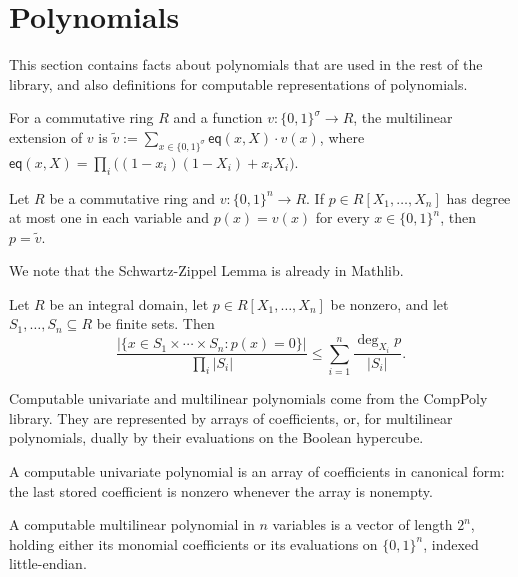 \section{Polynomials}\label{sec:polynomials}

This section contains facts about polynomials that are used in the rest of the library, and also definitions for computable representations of polynomials.

\begin{definition}
    \label{def:multilinear_extension}
    \leanok
    For a commutative ring $R$ and a function $v:\{0,1\}^{\sigma}\to R$, the multilinear extension
    of $v$ is $\widetilde{v}:=\sum_{x\in\{0,1\}^{\sigma}}\mathsf{eq}(x,X)\cdot v(x)$, where
    $\mathsf{eq}(x,X)=\prod_{i}\bigl((1-x_i)(1-X_i)+x_iX_i\bigr)$.
\end{definition}

\begin{theorem}
    \label{thm:multilinear_extension_unique}
    \leanok
    Let $R$ be a commutative ring and $v:\{0,1\}^n\to R$. If $p\in R[X_1,\ldots,X_n]$ has degree at
    most one in each variable and $p(x)=v(x)$ for every $x\in\{0,1\}^n$, then $p=\widetilde{v}$.
\end{theorem}

We note that the Schwartz-Zippel Lemma is already in Mathlib.

\begin{theorem}
    \label{thm:schwartz_zippel}
    \leanok
    Let $R$ be an integral domain, let $p\in R[X_1,\ldots,X_n]$ be nonzero, and let
    $S_1,\ldots,S_n\subseteq R$ be finite sets. Then
    \[
      \frac{\bigl|\{x\in S_1\times\cdots\times S_n : p(x)=0\}\bigr|}{\prod_{i}|S_i|}
      \le\sum_{i=1}^{n}\frac{\deg_{X_i}p}{|S_i|}.
    \]
\end{theorem}

Computable univariate and multilinear polynomials come from the CompPoly library. They are represented
by arrays of coefficients, or, for multilinear polynomials, dually by their evaluations on the
Boolean hypercube.

\begin{definition}
    \label{def:computable_univariate_polynomials}
    \leanok
    A computable univariate polynomial is an array of coefficients in canonical form: the last
    stored coefficient is nonzero whenever the array is nonempty.
\end{definition}

\begin{definition}
    \label{def:computable_multilinear_polynomials}
    \leanok
    A computable multilinear polynomial in $n$ variables is a vector of length $2^n$, holding either
    its monomial coefficients or its evaluations on $\{0,1\}^n$, indexed little-endian.
\end{definition}
